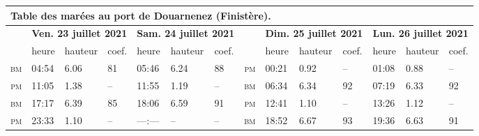 \begin{table}[!htb]\small\sffamily
    \begin{tabularx}{\linewidth}{rXXXXXXrXXXXXX}
        \multicolumn{14}{l}{\textbf{Table des marées au port de Douarnenez (Finistère).}}                                                                                                                                                                                                                             \\
        \toprule
                    & \multicolumn{3}{c}{\textbf{Ven. 23 juillet 2021}} & \multicolumn{3}{c}{\textbf{Sam. 24 juillet 2021}} &       & \multicolumn{3}{c}{\textbf{Dim. 25 juillet 2021}} & \multicolumn{3}{c}{\textbf{Lun. 26 juillet 2021}}                                                                           \\
                    & heure                                             & hauteur                                           & coef. & heure                                             & hauteur                                           & coef. &             & heure & hauteur & coef. & heure & hauteur & coef. \\
        \cmidrule(lr){2-4}\cmidrule(lr){5-7}\cmidrule(lr){9-11}\cmidrule(lr){12-14}
        \textsc{bm} & 04:54                                             & 6.06                                              & 81    & 05:46                                             & 6.24                                              & 88    & \textsc{pm} & 00:21 & 0.92    & --    & 01:08 & 0.88    & --    \\
        \textsc{pm} & 11:05                                             & 1.38                                              & --    & 11:55                                             & 1.19                                              & --    & \textsc{bm} & 06:34 & 6.34    & 92    & 07:19 & 6.33    & 92    \\
        \textsc{bm} & 17:17                                             & 6.39                                              & 85    & 18:06                                             & 6.59                                              & 91    & \textsc{pm} & 12:41 & 1.10    & --    & 13:26 & 1.12    & --    \\
        \textsc{pm} & 23:33                                             & 1.10                                              & --    & ---:---                                           & --                                                & --    & \textsc{bm} & 18:52 & 6.67    & 93    & 19:36 & 6.63    & 91    \\
        \bottomrule
    \end{tabularx}
\end{table}

